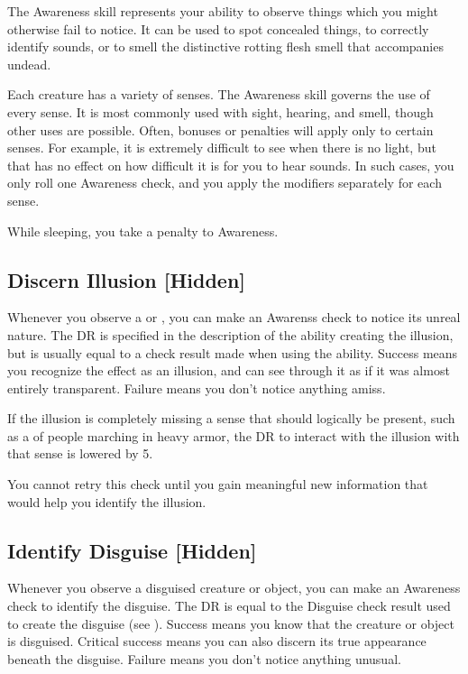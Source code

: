 \newpage
{}
    The Awareness skill represents your ability to observe things which you might otherwise fail to notice. It can be used to spot concealed things, to correctly identify sounds, or to smell the distinctive rotting flesh smell that accompanies undead.

    Each creature has a variety of senses. The Awareness skill governs the use of every sense. It is most commonly used with sight, hearing, and smell, though other uses are possible. Often, bonuses or penalties will apply only to certain senses. For example, it is extremely difficult to see when there is no light, but that has no effect on how difficult it is for you to hear sounds. In such cases, you only roll one Awareness check, and you apply the modifiers separately for each sense.

    While sleeping, you take a  penalty to Awareness.

    \subsection{Discern Illusion [Hidden]}
        Whenever you observe a  or , you can make an Awarenss check to notice its unreal nature.
        The DR is specified in the description of the ability creating the illusion, but is usually equal to a check result made when using the ability.
        Success means you recognize the effect as an illusion, and can see through it as if it was almost entirely transparent.
        Failure means you don't notice anything amiss.

        If the illusion is completely missing a sense that should logically be present, such as a  of people marching in heavy armor, the DR to interact with the illusion with that sense is lowered by 5.

        You cannot retry this check until you gain meaningful new information that would help you identify the illusion.

    \subsection{Identify Disguise [Hidden]}\label{Identify Disguise}
        Whenever you observe a disguised creature or object, you can make an Awareness check to identify the disguise.
        The DR is equal to the Disguise check result used to create the disguise (see ).
        Success means you know that the creature or object is disguised.
        Critical success means you can also discern its true appearance beneath the disguise.
        Failure means you don't notice anything unusual.

